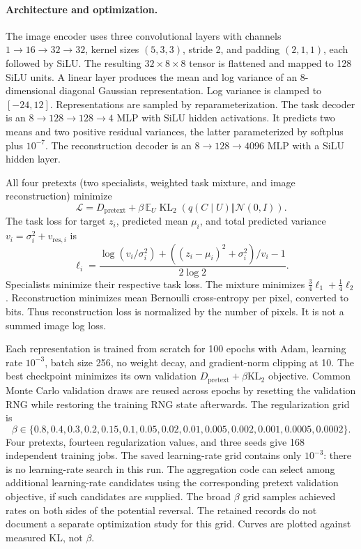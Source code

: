 \paragraph{Architecture and optimization.}
The image encoder uses three convolutional layers with channels
$1\!\rightarrow\!16\!\rightarrow\!32\!\rightarrow\!32$, kernel sizes
$(5,3,3)$, stride 2, and padding $(2,1,1)$, each followed by SiLU.
The resulting $32\times8\times8$ tensor is flattened and mapped to 128
SiLU units. A linear layer produces the mean and log variance of an
8-dimensional diagonal Gaussian representation. Log variance is clamped
to $[-24,12]$. Representations are sampled by reparameterization.
The task decoder is an $8\!\rightarrow\!128\!\rightarrow\!128\!\rightarrow\!4$
MLP with SiLU hidden activations. It predicts two means and two positive
residual variances, the latter parameterized by softplus plus $10^{-7}$.
The reconstruction decoder is an
$8\!\rightarrow\!128\!\rightarrow\!4096$ MLP with a SiLU hidden layer.

All four pretexts (two specialists, weighted task mixture, and image
reconstruction) minimize
\[
 \mathcal L= D_{\mathrm{pretext}}+
 \beta\,\mathbb E_U\operatorname{KL}_2(q(C\mid U)\Vert\mathcal N(0,I)).
\]
The task loss for target $z_i$, predicted mean $\mu_i$, and total predicted
variance $v_i=\sigma_i^2+v_{\mathrm{res},i}$ is
\[
 \ell_i=\frac{\log(v_i/\sigma_i^2)
       +((z_i-\mu_i)^2+\sigma_i^2)/v_i-1}{2\log 2}.
\]
Specialists minimize their respective task loss. The mixture minimizes
$\tfrac34\ell_1+\tfrac14\ell_2$. Reconstruction minimizes mean Bernoulli
cross-entropy per pixel, converted to bits. Thus reconstruction loss is
normalized by the number of pixels. It is not a summed image log loss.

Each representation is trained from scratch for 100 epochs with Adam,
learning rate $10^{-3}$, batch size 256, no weight decay, and gradient-norm
clipping at 10. The best checkpoint minimizes its own validation
$D_{\mathrm{pretext}}+\beta\mathrm{KL}_2$ objective. Common Monte Carlo
validation draws are reused across epochs by resetting the validation RNG
while restoring the training RNG state afterwards. The regularization grid is
\[
 \beta\in\{0.8,0.4,0.3,0.2,0.15,0.1,0.05,0.02,0.01,
                 0.005,0.002,0.001,0.0005,0.0002\}.
\]
Four pretexts, fourteen regularization values, and three seeds give 168
independent training jobs. The saved learning-rate grid contains only
$10^{-3}$: there is no learning-rate search in this run. The aggregation
code can select among additional learning-rate candidates using the
corresponding pretext validation objective, if such candidates are supplied.
The broad $\beta$ grid samples achieved rates on both sides of the potential
reversal. The retained records do not document a separate optimization
study for this grid. Curves are plotted against measured KL, not $\beta$.

